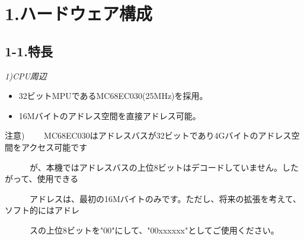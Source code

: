 ﻿\documentclass[twoside,a4paper,12pt]{article}
\begin{document}

\newpage

\cfoot{\ \\[-15mm]
- \thepage \ -}

\section*{1.ハードウェア構成}

\subsection*{1-1.特長}

\renewcommand{\labelitemi}{・}
\setlength{\parindent}{20mm}
\setlength{\parskip}{0mm}
\small
\itshape
1)CPU周辺
\begin{itemize}[leftmargin=30mm, itemsep=-1mm, topsep=1mm]
\item
32ビットMPUであるMC68EC030(25MHz)を採用。
\item
16Mバイトのアドレス空間を直接アドレス可能。
\end{itemize}

注意) \ \ \ \ MC68EC030はアドレスバスが32ビットであり4Gバイトのアドレス空間をアクセス可能です

\ \ \ \ \ \ が、本機ではアドレスバスの上位8ビットはデコードしていません。したがって、使用できる

\ \ \ \ \ \ アドレスは、最初の16Mバイトのみです。ただし、将来の拡張を考えて、ソフト的にはアドレ

\ \ \ \ \ \  スの上位8ビットを"00"にして、"00xxxxxx"としてご使用ください。
\end{document}
